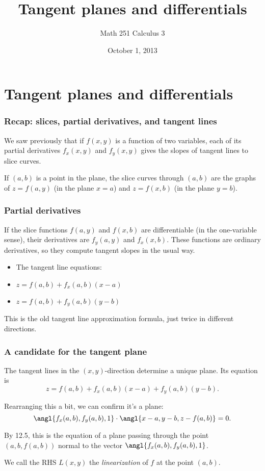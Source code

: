 \documentclass[11pt,ignorenonframetext,]{beamer}
\title{Tangent planes and differentials}
\author{Math 251 Calculus 3}
\date{October 1, 2013}
\begin{document}
\frame{\titlepage}

\section{Tangent planes and differentials}

\begin{frame}\frametitle{Recap: slices, partial derivatives, and tangent
lines}

We saw previously that if $f(x,y)$ is a function of two variables, each
of its partial derivatives $f_x(x,y)$ and $f_y(x,y)$ gives the slopes of
tangent lines to slice curves.

If $(a, b)$ is a point in the plane, the slice curves through $(a,b)$
are the graphs of $z = f(a, y)$ (in the plane $x = a$) and $z = f(x, b)$
(in the plane $y = b$).

\end{frame}

\begin{frame}\frametitle{Partial derivatives}

If the slice functions $f(a, y)$ and $f(x,b)$ are differentiable (in the
one-variable sense), their derivatives are $f_y(a,y)$ and $f_x(x,b)$.
These functions are ordinary derivatives, so they compute tangent slopes
in the usual way.

\begin{itemize}[<+->]
\itemsep1pt\parskip0pt
\item
  The tangent line equations:
\item
  $z = f(a, b) + f_x(a,b)(x - a)$
\item
  $z = f(a, b) + f_y(a,b)(y - b)$
\end{itemize}

This is the old tangent line approximation formula, just twice in
different directions.

\end{frame}

\begin{frame}\frametitle{A candidate for the tangent plane}

The tangent lines in the $(x,y)$-direction determine a unique plane. Its
equation is \[ z = f(a,b) + f_x(a,b)(x-a) + f_y(a,b)(y - b). \]

Rearranging this a bit, we can confirm it's a plane:
\[ \angl{f_x(a,b), f_y(a,b), 1} \cdot \angl{x - a, y - b, z - f(a,b)} = 0. \]

By 12.5, this is the equation of a plane passing through the point
$(a, b, f(a, b))$ normal to the vector $\angl{f_x(a,b), f_y(a,b), 1}$.

We call the RHS $L(x,y)$ the \emph{linearization} of $f$ at the point
$(a,b)$.

\end{frame}
\end{document}
